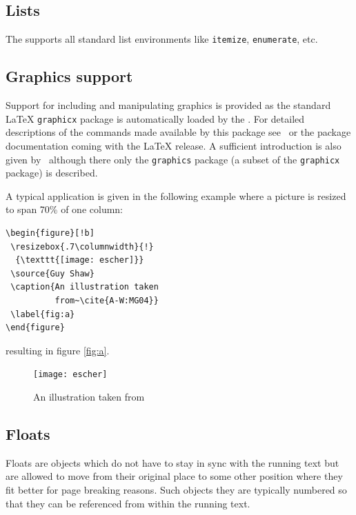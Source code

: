 \subsection{Lists}

The \aipcls{} supports all standard list environments like
\texttt{itemize}, \texttt{enumerate}, etc.

\subsection{Graphics support}

Support for including and manipulating graphics is provided as the
standard \LaTeX{} \texttt{graphicx} package is automatically loaded by
the \aipcls. For detailed descriptions of the commands made available
by this package see~\cite{A-W:GMR97} or the package documentation
coming with the \LaTeX{} release. A sufficient introduction is also
given by~\cite{A-W:LLa94} although there only the \texttt{graphics}
package (a subset of the \texttt{graphicx} package) is described.

A typical application is given in the following example where a
picture is resized to span 70\% of one column:
\begin{verbatim}
\begin{figure}[!b]
 \resizebox{.7\columnwidth}{!}
  {\texttt{[image: escher]}}
 \source{Guy Shaw}
 \caption{An illustration taken
          from~\cite{A-W:MG04}}
 \label{fig:a}
\end{figure}
\end{verbatim}
resulting in figure \vref{fig:a}.
\begin{figure}[!b]
 \resizebox{.7\columnwidth}{!}
  {\texttt{[image: escher]}}
 \caption{An illustration taken
          from~\cite{A-W:MG04}}
 \label{fig:a}
\end{figure}

\subsection{Floats}

Floats are objects which do not have to stay in sync with the running
text but are allowed to move from their original place to some other
position where they fit better for page breaking reasons. Such objects
they are typically numbered so that they can be referenced from within
the running text.

